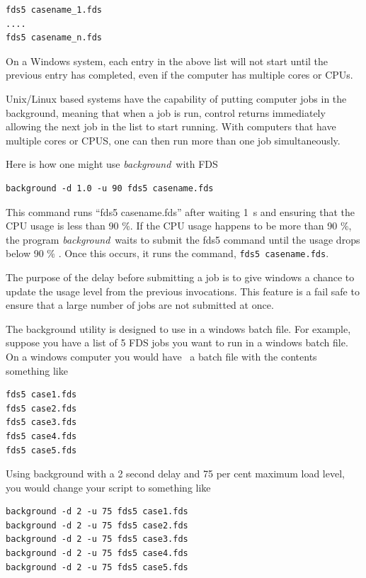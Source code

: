 \documentclass[11pt,twoside]{book}
\begin{document}
\begin{lstlisting}
fds5 casename_1.fds
....
fds5 casename_n.fds
\end{lstlisting}

On a Windows system, each entry in the above list will not start until the previous entry
has completed, even if the computer has multiple cores or CPUs.

Unix/Linux based systems have the capability of putting computer jobs in the background,
meaning that when a job is run, control returns immediately allowing the next job in the
list to start running.  With computers that have multiple cores or CPUS, one can then run
more than one job simultaneously.

Here is how one might use {\em background}\ with FDS

\begin{lstlisting}
background -d 1.0 -u 90 fds5 casename.fds
\end{lstlisting}

This command runs ``fds5 casename.fds'' after waiting 1~s and ensuring that the CPU usage is
less than 90 \%. If the CPU usage happens to be more than 90 \%, the program {\em background}\
waits to submit the fds5 command until the usage drops below 90 \% .  Once this occurs, it runs
the command, {\tt fds5 casename.fds}.

The purpose of the delay before submitting a job is to give windows a chance to update the usage level from the
previous invocations.  This feature is a fail safe to ensure that a large number of jobs are not
submitted at once.

The background utility is designed to use in a windows batch file. For example, suppose you have
a list of 5 FDS jobs you want to run in a windows batch file. On a windows computer you would have \
a batch file with the contents something like

\begin{lstlisting}
fds5 case1.fds
fds5 case2.fds
fds5 case3.fds
fds5 case4.fds
fds5 case5.fds
\end{lstlisting}

Using background with a 2 second delay and 75 per cent maximum load level, you would change your script to something like

\begin{lstlisting}
background -d 2 -u 75 fds5 case1.fds
background -d 2 -u 75 fds5 case2.fds
background -d 2 -u 75 fds5 case3.fds
background -d 2 -u 75 fds5 case4.fds
background -d 2 -u 75 fds5 case5.fds
\end{lstlisting}
\end{document}
